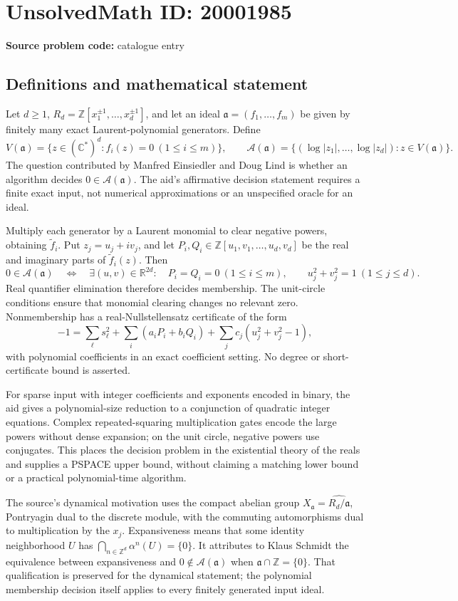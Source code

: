 \documentclass[11pt]{article}
\newcommand{\Z}{\mathbb{Z}}
\newcommand{\R}{\mathbb{R}}
\newcommand{\C}{\mathbb{C}}
\begin{document}
\section*{UnsolvedMath ID: 20001985}
\textbf{Source problem code:} catalogue entry
\subsection{Definitions and mathematical statement}
Let \(d\geq1\), \(R_d=\Z[x_1^{\pm1},\ldots,x_d^{\pm1}]\), and let an ideal \(\mathfrak a=(f_1,\ldots,f_m)\) be given by finitely many exact Laurent-polynomial generators. Define
\[
 V(\mathfrak a)=\{z\in(\C^*)^d:f_i(z)=0\ (1\leq i\leq m)\},\qquad
 \mathcal A(\mathfrak a)=\{(\log|z_1|,\ldots,\log|z_d|):z\in V(\mathfrak a)\}.
\]
The question contributed by Manfred Einsiedler and Doug Lind is whether an algorithm decides \(0\in\mathcal A(\mathfrak a)\). The aid's affirmative decision statement requires a finite exact input, not numerical approximations or an unspecified oracle for an ideal.

Multiply each generator by a Laurent monomial to clear negative powers, obtaining \(\widetilde f_i\). Put \(z_j=u_j+iv_j\), and let \(P_i,Q_i\in\Z[u_1,v_1,\ldots,u_d,v_d]\) be the real and imaginary parts of \(\widetilde f_i(z)\). Then
\[
 0\in\mathcal A(\mathfrak a)
 \quad\Longleftrightarrow\quad
 \exists(u,v)\in\R^{2d}:\quad
 P_i=Q_i=0\ (1\leq i\leq m),\qquad
 u_j^2+v_j^2=1\ (1\leq j\leq d).
\]
Real quantifier elimination therefore decides membership. The unit-circle conditions ensure that monomial clearing changes no relevant zero. Nonmembership has a real-Nullstellensatz certificate of the form
\[
 -1=\sum_\ell s_\ell^2+\sum_i(a_iP_i+b_iQ_i)
       +\sum_j c_j(u_j^2+v_j^2-1),
\]
with polynomial coefficients in an exact coefficient setting. No degree or short-certificate bound is asserted.

For sparse input with integer coefficients and exponents encoded in binary, the aid gives a polynomial-size reduction to a conjunction of quadratic integer equations. Complex repeated-squaring multiplication gates encode the large powers without dense expansion; on the unit circle, negative powers use conjugates. This places the decision problem in the existential theory of the reals and supplies a PSPACE upper bound, without claiming a matching lower bound or a practical polynomial-time algorithm.

The source's dynamical motivation uses the compact abelian group \(X_{\mathfrak a}=\widehat{R_d/\mathfrak a}\), Pontryagin dual to the discrete module, with the commuting automorphisms dual to multiplication by the \(x_j\). Expansiveness means that some identity neighborhood \(U\) has \(\bigcap_{n\in\Z^d}\alpha^n(U)=\{0\}\). It attributes to Klaus Schmidt the equivalence between expansiveness and \(0\notin\mathcal A(\mathfrak a)\) when \(\mathfrak a\cap\Z=\{0\}\). That qualification is preserved for the dynamical statement; the polynomial membership decision itself applies to every finitely generated input ideal.
\end{document}

